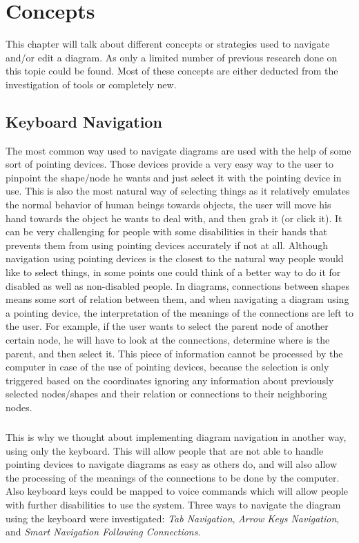 \chapter{Concepts}
\beginchapter
This chapter will talk about different concepts or strategies used to navigate and/or edit a diagram. As only a limited number of previous research done on this topic could be found. Most of these concepts are either deducted from the investigation of tools or completely new.

\section{Keyboard Navigation}
The most common way used to navigate diagrams are used with the help of some sort of pointing devices. Those devices provide a very easy way to the user to pinpoint the shape/node he wants and just select it with the pointing device in use. This is also the most natural way of selecting things as it relatively emulates the normal behavior of human beings towards objects, the user will move his hand towards the object he wants to deal with, and then grab it (or click it). It can be very challenging for people with some disabilities in their hands that prevents them from using pointing devices accurately if not at all. Although navigation using pointing devices is the closest to the natural way people would like to select things, in some points one could think of a better way to do it for disabled as well as non-disabled people. In diagrams, connections between shapes means some sort of relation between them, and when navigating a diagram using a pointing device, the interpretation of the meanings of the connections are left to the user. For example, if the user wants to select the parent node of another certain node, he will have to look at the connections, determine where is the parent, and then select it. This piece of information cannot be processed by the computer in case of the use of pointing devices, because the selection is only triggered based on the coordinates ignoring any information about previously selected nodes/shapes and their relation or connections to their neighboring nodes.

\paragraph{}
This is why we thought about implementing diagram navigation in another way, using only the keyboard. This will allow people that are not able to handle pointing devices to navigate diagrams as easy as others do, and will also allow the processing of the meanings of the connections to be done by the computer. Also keyboard keys could be mapped to voice commands which will allow people with further disabilities to use the system. Three ways to navigate the diagram using the keyboard were investigated: {\em Tab Navigation}, {\em Arrow Keys Navigation}, and {\em Smart Navigation Following Connections}.

